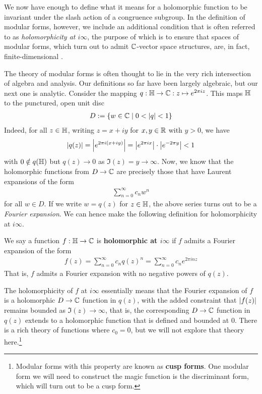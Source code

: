 We now have enough to define what it means for a holomorphic function to be invariant under the slash action of a congruence subgroup. In the definition of modular forms, however, we include an additional condition that is often referred to as \textit{holomorphicity at $i\infty$}, the purpose of which is to ensure that spaces of modular forms, which turn out to admit $\mathbb{C}$-vector space structures, are, in fact, finite-dimensional \cite{KevinFamilies}.

The theory of modular forms is often thought to lie in the very rich intersection of algebra and analysis. Our definitions so far have been largely algebraic, but our next one is analytic. Consider the mapping $q : \mathbb{H} \to \mathbb{C} : z \mapsto e^{2\pi i z}$. This maps $\mathbb{H}$ to the punctured, open unit disc
\begin{align*}
    D := \left\{ w \in \mathbb{C} \; \middle\vert \; 0 < \left\lvert q \right\rvert < 1 \right\}
\end{align*}
Indeed, for all $z \in \mathbb{H}$, writing $z = x + iy$ for $x, y \in \mathbb{R}$ with $y > 0$, we have
\begin{align*}
    \left\lvert q(z) \right\rvert = \left\lvert e^{2 \pi i \left( x + iy \right)} \right\rvert = \left\lvert e^{2\pi i x} \right\rvert \cdot \left\lvert e^{-2\pi y} \right\rvert < 1
\end{align*}
with $0 \notin q\!\left( \mathbb{H} \right)$ but $q(z) \to 0$ as $\Im(z) = y \to \infty$. Now, we know that the holomorphic functions from $D \to \mathbb{C}$ are precisely those that have Laurent expansions of the form
\begin{align*}
    \sum_{n=0}^{\infty} c_n w^n
\end{align*}
for all $w \in D$. If we write $w = q(z)$ for $z \in \mathbb{H}$, the above series turns out to be a \textit{Fourier expansion}. We can hence make the following definition for holomorphicity at $i\infty$.

\begin{boxdefinition}\label{Ch2:Def:Holo_at_ImInfty}
    We say a function $f : \mathbb{H} \to \mathbb{C}$ is \textbf{holomorphic at $i\infty$} if $f$ admits a Fourier expansion of the form
    \begin{align*}
        f(z) = \sum_{n=0}^{\infty} c_n q(z)^n = \sum_{n=0}^{\infty} c_n e^{2\pi i nz}
    \end{align*}
    That is, $f$ admits a Fourier expansion with no negative powers of $q(z)$.
\end{boxdefinition}

The holomorphicity of $f$ at $i\infty$ essentially means that the Fourier expansion of $f$ is a holomorphic $D \to \mathbb{C}$ function in $q(z)$, with the added constraint that $\left\lvert f(z) \right\rvert$ remains bounded as $\Im(z) \to \infty$, that is, the corresponding $D \to \mathbb{C}$ function in $q(z)$ extends to a holomorphic function that is defined and bounded at $0$. There is a rich theory of functions where $c_0 = 0$, but we will not explore that theory here.\footnote{Modular forms with this property are known as \textbf{cusp forms}. One modular form we will need to construct the magic function is the discriminant form, which will turn out to be a cusp form.}

